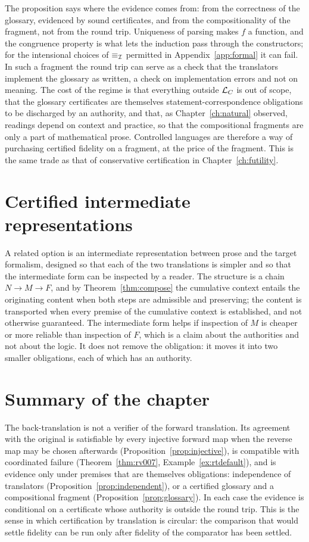 The proposition says where the evidence comes from: from the correctness of the glossary, evidenced by sound certificates, and from the compositionality of the fragment, not from the round trip. Uniqueness of parsing makes $f$ a function, and the congruence property is what lets the induction pass through the constructors; for the intensional choices of $\equiv_{\mathcal{I}}$ permitted in Appendix~\ref{app:formal} it can fail. In such a fragment the round trip can serve as a check that the translators implement the glossary as written, a check on implementation errors and not on meaning. The cost of the regime is that everything outside $\mathcal{L}_C$ is out of scope, that the glossary certificates are themselves statement-correspondence obligations to be discharged by an authority, and that, as Chapter~\ref{ch:natural} observed, readings depend on context and practice, so that the compositional fragments are only a part of mathematical prose. Controlled languages are therefore a way of purchasing certified fidelity on a fragment, at the price of the fragment. This is the same trade as that of conservative certification in Chapter~\ref{ch:futility}.

\section{Certified intermediate representations}

A related option is an intermediate representation between prose and the target formalism, designed so that each of the two translations is simpler and so that the intermediate form can be inspected by a reader. The structure is a chain $N\to M\to F$, and by Theorem~\ref{thm:compose} the cumulative context entails the originating content when both steps are admissible and preserving; the content is transported when every premise of the cumulative context is established, and not otherwise guaranteed. The intermediate form helps if inspection of $M$ is cheaper or more reliable than inspection of $F$, which is a claim about the authorities and not about the logic. It does not remove the obligation: it moves it into two smaller obligations, each of which has an authority.

\section{Summary of the chapter}

The back-translation is not a verifier of the forward translation. Its agreement with the original is satisfiable by every injective forward map when the reverse map may be chosen afterwards (Proposition~\ref{prop:injective}), is compatible with coordinated failure (Theorem~\ref{thm:rv007}, Example~\ref{ex:rtdefault}), and is evidence only under premises that are themselves obligations: independence of translators (Proposition~\ref{prop:independent}), or a certified glossary and a compositional fragment (Proposition~\ref{prop:glossary}). In each case the evidence is conditional on a certificate whose authority is outside the round trip. This is the sense in which certification by translation is circular: the comparison that would settle fidelity can be run only after fidelity of the comparator has been settled.
